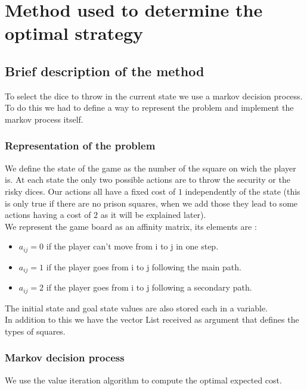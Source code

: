 \documentclass{eplDoc}
\begin{document}
\maketitle
\newpage

\section{Method used to determine the optimal strategy}

\subsection{Brief description of the method}
To select the dice to throw in the current state we use a markov decision process. To do this we had to define a way to represent the problem and implement the markov process itself. 

\subsubsection{Representation of the problem}
We define the state of the game as the number of the square on wich the player is. At each state the only two possible actions are to throw the security or the risky dices. Our actions all have a fixed cost of $1$ independently of the state (this is only true if there are no prison squares, when we add those they lead to some actions having a cost of $2$ as it will be explained later). \\ 
We represent the game board as an affinity matrix, its elements are : 
\begin{itemize}
	\item $a_{ij}=0$ if the player can't move from i to j in one step.
	\item $a_{ij}=1$ if the player goes from i to j following the main path.
	\item $a_{ij}=2$ if the player goes from i to j following a secondary path.
\end{itemize}
The initial state and goal state values are also stored each in a variable. \\ 
In addition to this we have the vector List received as argument that defines the types of squares. \\ 

\subsubsection{Markov decision process}
We use the value iteration algorithm to compute the optimal expected cost. 
\end{document}
